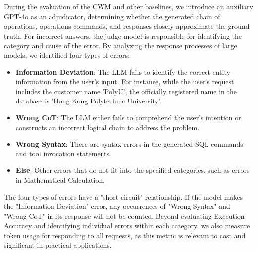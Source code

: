 \documentclass[preprint,12pt]{elsarticle}
\begin{document}

During the evaluation of the CWM and other baselines, we introduce an auxiliary GPT-4o as an adjudicator, determining whether the generated chain of operations, operations commands, and responses closely approximate the ground truth.
For incorrect answers, the judge model is responsible for identifying the category and cause of the error. 
By analyzing the response processes of large models, we identified four types of errors:
\begin{itemize}
    \item \textbf{Information Deviation}: The LLM fails to identify the correct entity information from the user's input. For instance, while the user's request includes the customer name 'PolyU', the officially registered name in the database is 'Hong Kong Polytechnic University'.
    \item \textbf{Wrong CoT}: The LLM either fails to comprehend the user's intention or constructs an incorrect logical chain to address the problem.
    \item \textbf{Wrong Syntax}: There are syntax errors in the generated SQL commands and tool invocation statements.
    \item \textbf{Else}: Other errors that do not fit into the specified categories, such as errors in Mathematical Calculation. 
\end{itemize}

The four types of errors have a "short-circuit" relationship.
If the model makes the "Information Deviation" error, any occurrences of "Wrong Syntax" and "Wrong CoT" in its response will not be counted.
Beyond evaluating Execution Accuracy and identifying individual errors within each category, we also measure token usage for responding to all requests, as this metric is relevant to cost and significant in practical applications.
\end{document}
